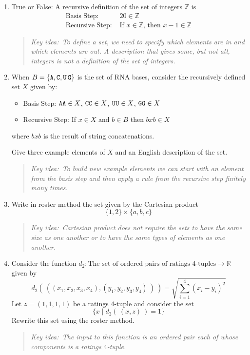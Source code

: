 
\newcommand{\KeyIdea}[1]{\begin{quote}{\it Key idea:~{#1}}\end{quote}}

\begin{enumerate}
    \item True or False: A recursive definition of the set of integers $\mathbb{Z}$ is 
    \[
        \begin{array}{ll}
        \textrm{Basis Step: } & 20 \in \mathbb{Z} \\
        \textrm{Recursive Step: } & \textrm{If } x \in \mathbb{Z} \textrm{, then } x-1 \in \mathbb{Z}
        \end{array}
    \]

        \KeyIdea{To define a set, we need to specify which elements are in and which elements are out.
        A description that gives some, but not all, integers is not a definition of the set of integers.}

    \item When $B = \{ \texttt{A}, \texttt{C}, \texttt{U}\, \texttt{G}\}$ is the set of RNA bases, 
    consider the recursively defined set $X$ given by:
    \begin{itemize}
    \item[] Basis Step: $\texttt{A}\texttt{A} \in X$, $\texttt{C}\texttt{C} \in X$, $\texttt{U}\texttt{U} \in X$, $\texttt{G}\texttt{G} \in X$
    \item[] Recursive Step: If $x \in X$ and $b \in B$ then $bxb \in X$
    \end{itemize}
    where $bxb$ is the result of string concatenations.

    Give three example elements of $X$ and an English description of the set.

        \KeyIdea{To build new example elements we can start with an element from 
        the basis step and then apply a rule from the recursive step finitely many times.}

    \item Write in roster method the set given by the Cartesian product
    \[ 
        \{1,2\} \times \{a,b,c\}
    \]

        \KeyIdea{Cartesian product does not require the sets to have the same size as one another
        or to have the same types of elements as one another.}

    \item Consider the function $d_2: \textrm{The set of ordered pairs of ratings $4$-tuples} \to \mathbb{R}$
    given by 
    \[ 
        d_2 (~( (x_1, x_2, x_3, x_4), (y_1, y_2, y_3, y_4)~)~) = \sqrt{\sum_{i=1}^4 (x_i - y_i)^2}
    \]
    Let $z = (1,1,1,1)$ be a ratings $4$-tuple and consider the set
    \[
        \{ x \mid d_2 ( ~(x,z)~) = 1 \}
    \]
    Rewrite this set using the roster method.

        \KeyIdea{The input to this function is an ordered pair each of whose components is a ratings $4$-tuple.}

\end{enumerate}
